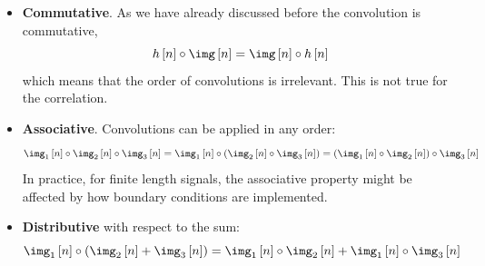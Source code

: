 \begin{itemize}
\item {\bf Commutative}. As we have already discussed before the convolution is commutative,
\begin{equation}
 h\left[n\right] \circ \img \left[n\right] = \img \left[n\right] \circ h\left[n\right]
\end{equation}
which means that the order of convolutions is irrelevant. This is not true for the correlation. 

\item {\bf Associative}. Convolutions can be applied in any order:
\begin{equation}
\img_1 \left[n\right] \circ \img_2 \left[n\right] \circ \img_3 \left[n\right] = \img_1\left[n\right] \circ (\img_2\left[n\right] \circ \img_3\left[n\right]) = (\img_1\left[n\right] \circ \img_2\left[n\right]) \circ \img_3\left[n\right] \label{eqn:linear_image_filtering:conv_associative_property} 
\end{equation}
In practice, for finite length signals, the associative property might be affected by how boundary conditions are implemented. 

\item {\bf Distributive} with respect to the sum:
\begin{equation}
 \img_1\left[n\right] \circ (\img_2\left[n\right] + \img_3\left[n\right] ) = \img_1\left[n\right] \circ \img_2\left[n\right] +  \img_1 \left[n\right] \circ \img_3 \left[n\right]
\end{equation}



\end{itemize}
